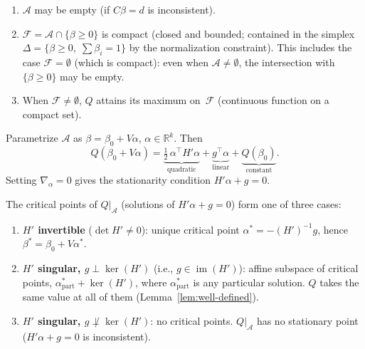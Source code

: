 \begin{proposition}%
\label{prop:basic-properties}
\leavevmode
\begin{enumerate}
  \item $\mathcal{A}$ may be empty (if $C\beta = d$ is inconsistent).
  \item $\mathcal{F} = \mathcal{A} \cap \{\beta \geq 0\}$
    is compact (closed and bounded; contained in the simplex
    $\Delta = \{\beta \geq 0,\; \sum \beta_i = 1\}$
    by the normalization constraint).
    This includes the case $\mathcal{F} = \emptyset$
    (which is compact): even when $\mathcal{A} \neq \emptyset$,
    the intersection with $\{\beta \geq 0\}$ may be empty.
  \item When $\mathcal{F} \neq \emptyset$,
    $Q$ attains its maximum on~$\mathcal{F}$
    (continuous function on a compact set).
\end{enumerate}
\end{proposition}

\begin{proposition}\label{prop:q-on-affine}
Parametrize $\mathcal{A}$ as $\beta = \beta_0 + V\alpha$,
$\alpha \in \mathbb{R}^k$.  Then
\begin{equation}\label{eq:q-restricted}
  Q(\beta_0 + V\alpha)
  = \underbrace{\tfrac{1}{2}\,\alpha^\top H' \alpha}_{\text{quadratic}}
  + \underbrace{g^\top \alpha}_{\text{linear}}
  + \underbrace{Q(\beta_0)}_{\text{constant}}.
\end{equation}
Setting $\nabla_\alpha = 0$ gives the stationarity condition
$H' \alpha + g = 0$.
\end{proposition}

\begin{proposition}\label{prop:critical-points}
The critical points of $Q|_{\mathcal{A}}$
(solutions of $H'\alpha + g = 0$) form one of three cases:
\begin{enumerate}
  \item \textbf{$H'$ invertible} ($\det H' \neq 0$):
    unique critical point $\alpha^* = -(H')^{-1} g$,
    hence $\beta^* = \beta_0 + V\alpha^*$.
  \item \textbf{$H'$ singular, $g \perp \ker(H')$}
    (i.e., $g \in \operatorname{im}(H')$):
    affine subspace of critical points,
    $\alpha^*_{\mathrm{part}} + \ker(H')$,
    where $\alpha^*_{\mathrm{part}}$ is any particular solution.
    $Q$ takes the same value at all of them
    (Lemma~\ref{lem:well-defined}).
  \item \textbf{$H'$ singular, $g \not\perp \ker(H')$}:
    no critical points.
    $Q|_{\mathcal{A}}$ has no stationary point
    ($H'\alpha + g = 0$ is inconsistent).
\end{enumerate}
\end{proposition}

